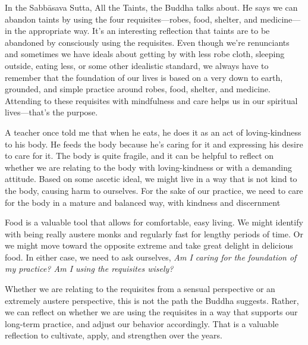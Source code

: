 
In the Sabbāsava Sutta, All the Taints, the Buddha talks about. He 
says we can abandon taints by using the four requisites---robes, food, 
shelter, and medicine---in the appropriate way. It's an interesting 
reflection that taints are to be abandoned by consciously using the 
requisites. Even though we're renunciants and sometimes we have ideals 
about getting by with less robe cloth, sleeping outside, eating less, 
or some other idealistic standard, we always have to remember that the 
foundation of our lives is based on a very down to earth, grounded, and 
simple practice around robes, food, shelter, and medicine. Attending to 
these requisites with mindfulness and care helps us in our spiritual 
lives---that's the purpose.

A teacher once told me that when he eats, he does it as an act of 
loving-kindness to his body. He feeds the body because he's caring for 
it and expressing his desire to care for it. The body is quite fragile, 
and it can be helpful to reflect on whether we are relating to the body 
with loving-kindness or with a demanding attitude. Based on some 
ascetic ideal, we might live in a way that is not kind to the body, 
causing harm to ourselves. For the sake of our practice, we need to 
care for the body in a mature and balanced way, with kindness and 
discernment

Food is a valuable tool that allows for comfortable, easy living. We 
might identify with being really austere monks and regularly fast for 
lengthy periods of time. Or we might move toward the opposite extreme 
and take great delight in delicious food. In either case, we need to 
ask ourselves, \emph{Am I caring for the foundation of my practice? Am 
I using the requisites wisely?}

Whether we are relating to the requisites from a sensual perspective or 
an extremely austere perspective, this is not the path the Buddha 
suggests. Rather, we can reflect on whether we are using the requisites 
in a way that supports our long-term practice, and adjust our behavior 
accordingly. That is a valuable reflection to cultivate, apply, and 
strengthen over the years.

